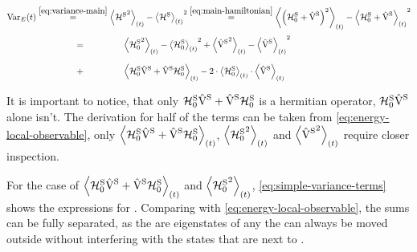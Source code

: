 \begin{equation}
    \label{eq:variance-split}
    \begin{split}
        \varianceOft &\stackrel{\ref{eq:variance-main}}{=} \timeExpectationVal{{\pictureHamiltonian[\schroedingerPicture]}^2} - {\timeExpectationVal{\pictureHamiltonian[\schroedingerPicture]}}^2
        \stackrel{\ref{eq:main-hamiltonian}}{=} \timeExpectationVal{\left(\HzeroHamiltonian[\schroedingerPicture] + \Vhamiltonian[\schroedingerPicture]\right)^2} - {\timeExpectationVal{\HzeroHamiltonian[\schroedingerPicture] + \Vhamiltonian[\schroedingerPicture]}}^2
        \\&\stackrel{\phantom{\ref{eq:main-hamiltonian}}}{=}
        \timeExpectationVal{{\HzeroHamiltonian[\schroedingerPicture]}^2} - {\timeExpectationVal{\HzeroHamiltonian[\schroedingerPicture]}}^2
        +
        \timeExpectationVal{{\Vhamiltonian[\schroedingerPicture]}^2} - {\timeExpectationVal{\Vhamiltonian[\schroedingerPicture]}}^2
        \\&\stackrel{\phantom{\ref{eq:main-hamiltonian}}}{+}
        \timeExpectationVal{\HzeroHamiltonian[\schroedingerPicture]\Vhamiltonian[\schroedingerPicture] + \Vhamiltonian[\schroedingerPicture]\HzeroHamiltonian[\schroedingerPicture]}
        -        2\cdot 
        \timeExpectationVal{\HzeroHamiltonian[\schroedingerPicture]}\cdot \timeExpectationVal{\Vhamiltonian[\schroedingerPicture]}
    \end{split}
\end{equation}

It is important to notice, that only $\HzeroHamiltonian[\schroedingerPicture]\Vhamiltonian[\schroedingerPicture] + \Vhamiltonian[\schroedingerPicture]\HzeroHamiltonian[\schroedingerPicture]$ is a hermitian operator, $\HzeroHamiltonian[\schroedingerPicture]\Vhamiltonian[\schroedingerPicture]$ alone isn't.
The derivation for half of the terms can be taken from \autoref{eq:energy-local-observable}, only $\timeExpectationVal{\HzeroHamiltonian[\schroedingerPicture]\Vhamiltonian[\schroedingerPicture] + \Vhamiltonian[\schroedingerPicture]\HzeroHamiltonian[\schroedingerPicture]}$, $\timeExpectationVal{{\HzeroHamiltonian[\schroedingerPicture]}^2}$ and $\timeExpectationVal{{\Vhamiltonian[\schroedingerPicture]}^2}$ require closer inspection.

For the case of $\timeExpectationVal{\HzeroHamiltonian[\schroedingerPicture]\Vhamiltonian[\schroedingerPicture] + \Vhamiltonian[\schroedingerPicture]\HzeroHamiltonian[\schroedingerPicture]}$ and $\timeExpectationVal{{\HzeroHamiltonian[\schroedingerPicture]}^2}$, \autoref{eq:simple-variance-terms} shows the expressions for . Comparing with \autoref{eq:energy-local-observable}, the sums can be fully separated, as the \ketN[N] are eigenstates of \HzeroHamiltonian[\schroedingerPicture] any the \HzeroHamiltonian[\schroedingerPicture] can always be moved outside without interfering with the states that are next to \Vhamiltonian[\schroedingerPicture].


